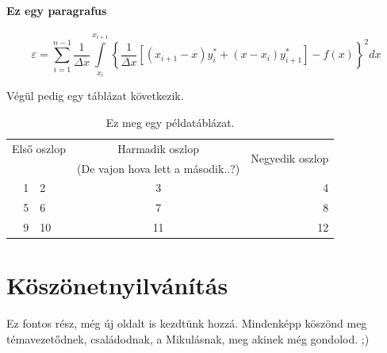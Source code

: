 \documentclass[a4paper, 12pt]{article}
\numberwithin{equation}{section}          %
\numberwithin{figure}{subsection}
\begin{document}
\paragraph{Ez egy paragrafus}
\lipsum[2-4]
\begin{equation}
  \varepsilon=\sum_{i=1}^{n-1} \frac{1}{\Delta x}\int\limits_{x_i}^{x_{i+1}}\left\{\frac{1}{\Delta x}
  \left[(x_{i+1}-x)y_i^*+(x-x_i)y_{i+1}^*\right]-f(x)\right\}^2dx
\end{equation}

Végül pedig egy táblázat következik.

\begin{table}[h!]
\caption{Ez meg egy példatáblázat.}
\label{tab:tab}
\begin{center}
\small
  \begin{tabular}{r@{,}lc||r}

\hline
\hline
    \multicolumn{2}{c}{Első oszlop} & Harmadik oszlop & \multirow{2}{*}{Negyedik oszlop} \\
     \multicolumn{2}{c}{}           & (De vajon hova lett a második..?) & \\
\hline
\hline
  1 & 2 & 3 & 4 \\
  5 & 6 & 7 & 8 \\
\hline
  9 & 10 & 11 & 12 \\
\hline
\hline

\end{tabular}
\end{center}
\end{table}



\clearpage 

\vspace*{2cm}

\section*{Köszönetnyilvánítás}
Ez fontos rész, még új oldalt is kezdtünk hozzá. Mindenképp köszönd meg témavezetődnek, családodnak, a Mikulásnak, meg akinek még gondolod. ;)
\end{document}
